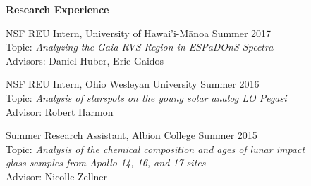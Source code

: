 \documentclass{resume} %
\begin{document}

\vspace{-0.1in}
\begin{rSection}{\textbf{Research Experience}}
\vspace{0.02in}

{NSF REU Intern, {University of Hawai'i-M\=anoa}} \hfill {Summer 2017}
\vspace{0.04in}
\\
{Topic:} \emph{Analyzing the Gaia RVS Region in ESPaDOnS Spectra}
\vspace{0.04in}
\\
{Advisors:} Daniel Huber, Eric Gaidos
\vspace{0.05in}

{NSF REU Intern, Ohio Wesleyan University} \hfill {Summer 2016}
\vspace{0.04in}
\\
{ Topic:} \emph{Analysis of starspots on the young solar analog LO Pegasi}
\vspace{0.04in}
\\
{ Advisor:} Robert Harmon
\vspace{0.05in}

{ Summer Research Assistant, Albion College} \hfill {Summer 2015}
\vspace{0.04in}
\\
{ Topic:} \emph{Analysis of the chemical composition and ages of lunar impact \\ glass samples from Apollo 14, 16, and 17 sites}
\vspace{0.04in}
\\
{ Advisor:}  Nicolle Zellner
\vspace{0.05in}
\end{rSection}


\end{document}
